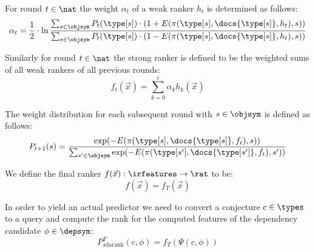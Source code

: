\begin{definition}
  For round $t \in \nat$ the weight $\alpha_t$ of a weak ranker $h_t$ is determined as follows:
  \[
    \alpha_t = \frac{1}{2} \cdot \ln \frac{
      \sum_{s \in \objsym} P_t(\type[s]) \cdot ( 1 + E(\pi(\type[s], \docs{\type[s]}, h_t), s) )
    }{
      \sum_{s \in \objsym} P_t(\type[s]) \cdot ( 1 - E(\pi(\type[s], \docs{\type[s]}, h_t), s) )
    }
  \]
\end{definition}

\begin{definition}
  Similarly for round $t \in \nat$ the strong ranker is defined to be the weighted
  sums of all weak rankers of all previous rounds:
  $$ f_t(\vec{x}) = \sum_{k=0}^{t} \alpha_k h_k(\vec{x}) $$
\end{definition}

\begin{definition}
  The weight distribution for each subsequent round with $s \in \objsym$ is defined as follows:
  $$
    P_{t+1}(s) = \frac{
      \exp(- E(\pi(\type[s], \docs{\type[s]}, f_t), s))
    }{
      \sum_{s' \in \objsym} \exp(- E(\pi(\type[s'], \docs{\type[s']}, f_t), s'))
    }
  $$
\end{definition}

\begin{definition}
  We define the final ranker $f(\vec{x}) : \irfeatures \rightarrow \rat$ to be:
  $$ f(\vec{x}) = f_T(\vec{x})$$
\end{definition}

\begin{definition}
  In order to yield an actual predictor we need to convert a conjecture $c \in \types$
  to a query and compute the rank for the computed features of the dependency candidate $\phi \in \depsym$:
  $$ P_{\text{adarank}}^T(c, \phi) = f_T(\Psi(c, \phi)) $$
\end{definition}
